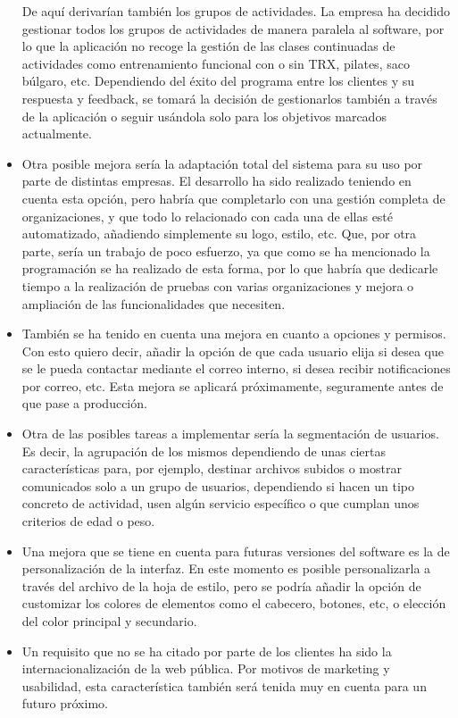 \begin{itemize}
De aquí derivarían también los grupos de actividades. La empresa ha decidido gestionar todos los grupos de actividades de manera paralela al software, por lo que la aplicación no recoge la gestión de las clases continuadas de actividades como entrenamiento funcional con o sin TRX, pilates, saco búlgaro, etc. Dependiendo del éxito del programa entre los clientes y su respuesta y feedback, se tomará la decisión de gestionarlos también a través de la aplicación o seguir usándola solo para los objetivos marcados actualmente.
\item Otra posible mejora sería la adaptación total del sistema para su uso por parte de distintas empresas. El desarrollo ha sido realizado teniendo en cuenta esta opción, pero habría que completarlo con una gestión completa de organizaciones, y que todo lo relacionado con cada una de ellas esté automatizado, añadiendo simplemente su logo, estilo, etc. Que, por otra parte, sería un trabajo de poco esfuerzo, ya que como se ha mencionado la programación se ha realizado de esta forma, por lo que habría que dedicarle tiempo a la realización de pruebas con varias organizaciones y mejora o ampliación de las funcionalidades que necesiten.
\item También se ha tenido en cuenta una mejora en cuanto a opciones y permisos. Con esto quiero decir, añadir la opción de que cada usuario elija si desea que se le pueda contactar mediante el correo interno, si desea recibir notificaciones por correo, etc. Esta mejora se aplicará próximamente, seguramente antes de que pase a producción. 
\item Otra de las posibles tareas a implementar sería la segmentación de usuarios. Es decir, la agrupación de los mismos dependiendo de unas ciertas características para, por ejemplo, destinar archivos subidos o mostrar comunicados solo a un grupo de usuarios, dependiendo si hacen un tipo concreto de actividad, usen algún servicio específico o que cumplan unos criterios de edad o peso.
\item Una mejora que se tiene en cuenta para futuras versiones del software es la de personalización de la interfaz. En este momento es posible personalizarla a través del archivo de la hoja de estilo, pero se podría añadir la opción de customizar los colores de elementos como el cabecero, botones, etc, o elección del color principal y secundario.
\item Un requisito que no se ha citado por parte de los clientes ha sido la internacionalización de la web pública. Por motivos de marketing y usabilidad, esta característica también será tenida muy en cuenta para un futuro próximo.

\end{itemize}
